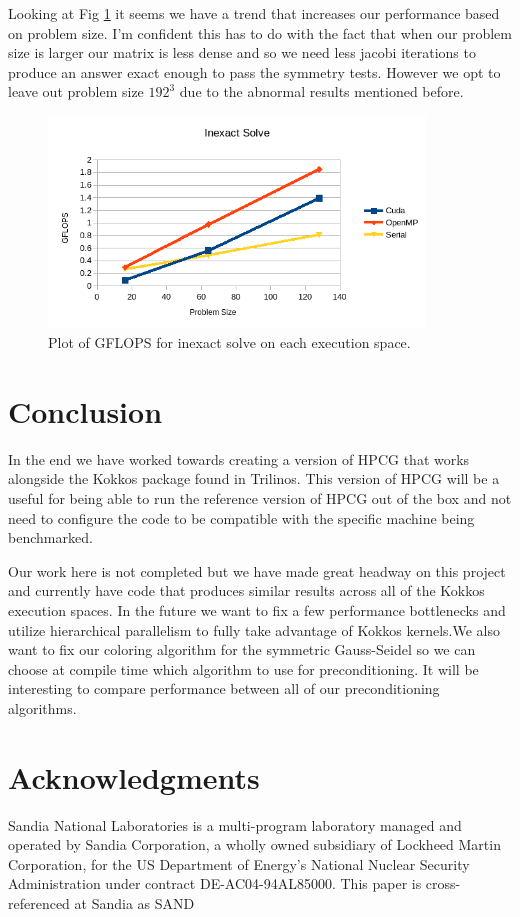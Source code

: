 \documentclass{ccr15}
\begin{document}
Looking at Fig \ref{Inexact} it seems we have a trend that increases our performance based on
problem size. I'm confident this has to do with the fact that when our problem size is larger our
matrix is less dense and so we need less jacobi iterations to produce an answer exact enough to
pass the symmetry tests. However we opt to leave out problem size $192^3$ due to the abnormal
results mentioned before.

\begin{figure}[H]
	\centering
	\includegraphics[width=10cm]{plots/ZAB-InexactSolve.png}
	\caption{Plot of GFLOPS for inexact solve on each execution space.}
	\label{Inexact}
\end{figure}

\section{Conclusion}
In the end we have worked towards creating a version of HPCG that works alongside the Kokkos
package found in Trilinos. This version of HPCG will be a useful for being able to run the reference
version of HPCG out of the box and not need to configure the code to be compatible with the
specific machine being benchmarked.

Our work here is not completed but we have made great headway on this project and currently have
code that produces similar results across all of the Kokkos execution spaces. In the future we want to
fix a few performance bottlenecks and utilize hierarchical parallelism to fully take advantage of Kokkos
kernels.We also want to fix our coloring algorithm for the symmetric Gauss-Seidel so we can choose at
compile time which algorithm to use for preconditioning. It will be interesting to compare performance
between all of our preconditioning algorithms.
\section{Acknowledgments}
Sandia National Laboratories is a multi-program laboratory managed and operated by Sandia Corporation, a wholly owned subsidiary of Lockheed Martin Corporation, for the US Department of Energy{'}s National Nuclear Security Administration under contract DE-AC04-94AL85000. This paper is cross-referenced at Sandia as SAND
\end{document}
